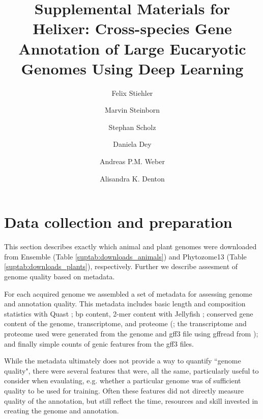 \documentclass{article}
\begin{document}
\title{Supplemental Materials for \\ Helixer: Cross-species Gene Annotation of Large Eucaryotic Genomes Using Deep Learning}

\author[1]{Felix Stiehler}
\author[1]{Marvin Steinborn}
\author[ \hspace{-1ex}]{Stephan Scholz}
\author[ \hspace{-1ex}]{Daniela Dey}
\author[1]{Andreas P.M. Weber}
\author[1]{Alisandra K. Denton}


\date{}
\maketitle
\tableofcontents

\newpage
\section{Data collection and preparation}
\label{ssec:data_prep}
This section describes exactly which animal and plant genomes were downloaded
from Ensemble (Table \ref{suptab:downloads_animals}) and 
Phytozome13 (Table \ref{suptab:downloads_plants}), respectively.
Further we describe assesment of genome quality based on metadata. 

For each acquired genome we assembled a set of metadata for assessing 
genome and annotation quality. 
This metadata includes basic length and 
composition statistics with Quast \citep{gurevich2013quast}; 
bp content, 2-mer content with Jellyfish \citep{marccais2011fast};
conserved gene content of the genome, transcriptome, and proteome (\cite{simao2015busco};
the transcriptome and proteome used were generated from the genome and gff3 file 
using gffread from \cite{trapnell2012differential}); 
and finally simple counts of genic features from the gff3 files.

While the metadata ultimately does not provide a way to quantify ``genome quality",
there were several features that were, all the same, particularly useful to consider
when evaulating, e.g. whether a particular genome was of sufficient quality to be
used for training. Often these features did not directly measure quality of
the annotation, but still reflect the time, resources and skill invested in
creating the genome and annotation. 
\end{document}
